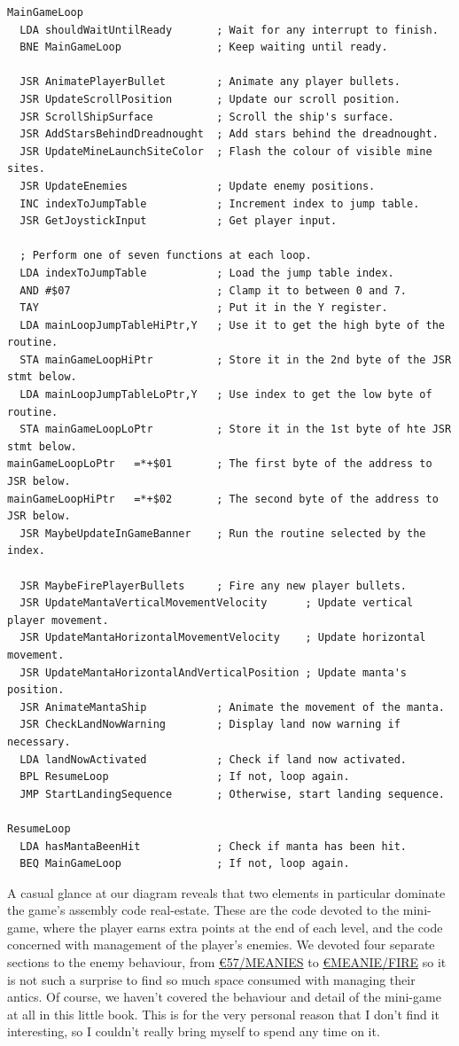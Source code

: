 \begin{lstlisting}[basicstyle=\scriptsize\ttfamily]
MainGameLoop
  LDA shouldWaitUntilReady       ; Wait for any interrupt to finish.
  BNE MainGameLoop               ; Keep waiting until ready.

  JSR AnimatePlayerBullet        ; Animate any player bullets.
  JSR UpdateScrollPosition       ; Update our scroll position.
  JSR ScrollShipSurface          ; Scroll the ship's surface.
  JSR AddStarsBehindDreadnought  ; Add stars behind the dreadnought.
  JSR UpdateMineLaunchSiteColor  ; Flash the colour of visible mine sites.
  JSR UpdateEnemies              ; Update enemy positions.
  INC indexToJumpTable           ; Increment index to jump table.
  JSR GetJoystickInput           ; Get player input.

  ; Perform one of seven functions at each loop.
  LDA indexToJumpTable           ; Load the jump table index.
  AND #$07                       ; Clamp it to between 0 and 7.
  TAY                            ; Put it in the Y register.
  LDA mainLoopJumpTableHiPtr,Y   ; Use it to get the high byte of the routine.
  STA mainGameLoopHiPtr          ; Store it in the 2nd byte of the JSR stmt below.
  LDA mainLoopJumpTableLoPtr,Y   ; Use index to get the low byte of routine.
  STA mainGameLoopLoPtr          ; Store it in the 1st byte of hte JSR stmt below.
mainGameLoopLoPtr   =*+$01       ; The first byte of the address to JSR below.
mainGameLoopHiPtr   =*+$02       ; The second byte of the address to JSR below.
  JSR MaybeUpdateInGameBanner    ; Run the routine selected by the index.

  JSR MaybeFirePlayerBullets     ; Fire any new player bullets.
  JSR UpdateMantaVerticalMovementVelocity      ; Update vertical player movement.
  JSR UpdateMantaHorizontalMovementVelocity    ; Update horizontal movement.
  JSR UpdateMantaHorizontalAndVerticalPosition ; Update manta's position.
  JSR AnimateMantaShip           ; Animate the movement of the manta.
  JSR CheckLandNowWarning        ; Display land now warning if necessary.
  LDA landNowActivated           ; Check if land now activated.
  BPL ResumeLoop                 ; If not, loop again.
  JMP StartLandingSequence       ; Otherwise, start landing sequence.

ResumeLoop
  LDA hasMantaBeenHit            ; Check if manta has been hit.
  BEQ MainGameLoop               ; If not, loop again.
\end{lstlisting}

A casual glance at our diagram reveals that two elements in particular dominate the game's assembly code real-estate. These are the code devoted to the mini-game, where the player
earns extra points at the end of each level, and the code concerned with management of the player's enemies. We devoted four separate sections
to the enemy behaviour, from 
\hyperref[sec:meanies]{\euro{57/MEANIES}}
to
\hyperref[sec:meanie_fire]{\euro{MEANIE/FIRE}}
so it is not such a surprise to find so much space consumed with managing their antics. Of course, we haven't covered the behaviour and detail
of the mini-game at all in this little book. This is for the very personal reason that I don't find it interesting, so I couldn't really bring
myself to spend any time on it. 

